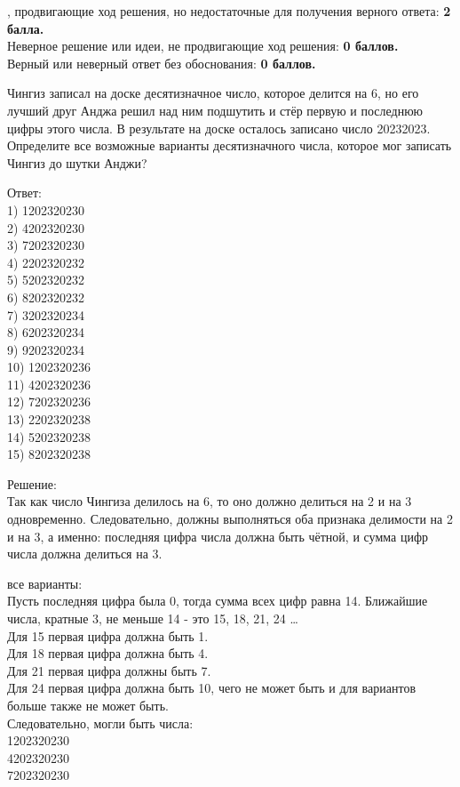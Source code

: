 \newpage

\hspace{3mm}

, продвигающие ход решения, но недостаточные для получения верного ответа: \textbf{2 балла.}\\
Неверное решение или идеи, не продвигающие ход решения: \textbf{0 баллов.}\\
Верный или неверный ответ без обоснования: \textbf{0 баллов.}

\hspace{3mm}

Чингиз записал на доске десятизначное число, которое делится на 6, но его лучший друг Анджа решил над ним подшутить и стёр первую и последнюю цифры этого числа. В результате на доске осталось записано число 20232023. Определите все возможные варианты десятизначного числа, которое мог записать Чингиз до шутки Анджи?

Ответ:\\
1) 1202320230\\
2) 4202320230\\
3) 7202320230\\
4) 2202320232\\
5) 5202320232\\
6) 8202320232\\ 
7) 3202320234\\
8) 6202320234\\
9) 9202320234\\ 
10) 1202320236\\
11) 4202320236\\
12) 7202320236\\ 
13) 2202320238\\
14) 5202320238\\
15) 8202320238

\hspace{3mm}

Решение:\\
Так как число Чингиза делилось на 6, то оно должно делиться на 2 и на 3 одновременно. Следовательно, должны выполняться оба признака делимости на 2 и на 3, а именно: последняя цифра числа должна быть чётной, и сумма цифр числа должна делиться на 3.

\newpage

\hspace{3mm}

 все варианты:\\
Пусть последняя цифра была 0, тогда сумма всех цифр равна 14. Ближайшие числа, кратные 3, не меньше 14 - это 15, 18, 21, 24 …\\
Для 15 первая цифра должна быть 1.\\
Для 18 первая цифра должна быть 4.\\
Для 21 первая цифра должны быть 7.\\
Для 24 первая цифра должна быть 10, чего не может быть и для вариантов больше также не может быть.\\
Следовательно, могли быть числа:\\
1202320230\\
4202320230\\
7202320230

